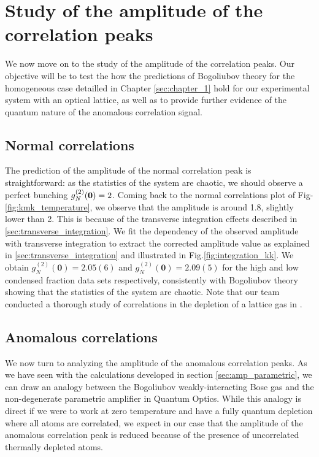 \section{Study of the amplitude of the correlation peaks}

We now move on to the study of the amplitude of the correlation peaks. Our objective will be to test the how the predictions of Bogoliubov theory for the homogeneous case detailled in Chapter \ref{sec:chapter_1} hold for our experimental system with an optical lattice, as well as to provide further evidence of the quantum nature of the anomalous correlation signal.




\subsection{Normal correlations}

The prediction of the amplitude of the normal correlation peak is straightforward: as the statistics of the system are chaotic, we should observe a perfect bunching $g^{(2)}_N (\bm{0})=2$.
Coming back to the normal correlations plot of Fig-\ref{fig:kmk_temperature}, we observe that the amplitude is around 1.8, \ie slightly lower than 2. This is because of the transverse integration effects described in \ref{sec:transverse_integration}. We fit the dependency of the observed amplitude with transverse integration to extract the corrected amplitude value as explained in \ref{sec:transverse_integration} and illustrated in Fig.\ref{fig:integration_kk}. We obtain $g^{(2)}_N(\bm{0})=2.05(6)$ and $g^{(2)}_N(\bm{0})=2.09(5)$ for the high and low condensed fraction data sets respectively, consistently with Bogoliubov theory showing that the statistics of the system are chaotic. Note that our team conducted a thorough study of \kk correlations in the depletion of a lattice gas in \cite{cayla2020}. 



\subsection{Anomalous correlations}

\label{sec:amp_anomalous}

We now turn to analyzing the amplitude of the anomalous correlation peaks. As we have seen with the calculations developed in section \ref{sec:amp_parametric}, we can draw an analogy between the Bogoliubov weakly-interacting Bose gas and the non-degenerate parametric amplifier in Quantum Optics. While this analogy is direct if we were to work at zero temperature and have a fully quantum depletion where all atoms are correlated, we expect in our case that the amplitude of the anomalous correlation peak is reduced because of the presence of uncorrelated thermally depleted atoms. 


